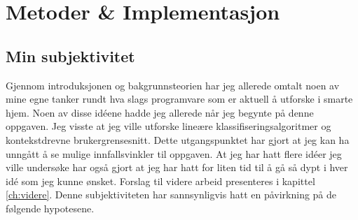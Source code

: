 \section[Metoder \& Implementasjon]{Metoder \& Implementasjon}
\subsection{Min subjektivitet}
Gjennom introduksjonen og bakgrunnsteorien har jeg allerede omtalt noen av mine egne tanker rundt hva slags programvare som er aktuell å utforske i smarte hjem. Noen av disse idéene hadde jeg allerede når jeg begynte på denne oppgaven. Jeg visste at jeg ville utforske lineære klassifiseringsalgoritmer og kontekstdrevne brukergrensesnitt. Dette utgangspunktet har gjort at jeg kan ha unngått å se mulige innfallsvinkler til oppgaven. At jeg har hatt flere idéer jeg ville undersøke har også gjort at jeg har hatt for liten tid til å gå så dypt i hver idé som jeg kunne ønsket. Forslag til videre arbeid presenteres i kapittel \ref{ch:videre}. Denne subjektiviteten har sannsynligvis hatt en påvirkning på de følgende hypotesene.\\

